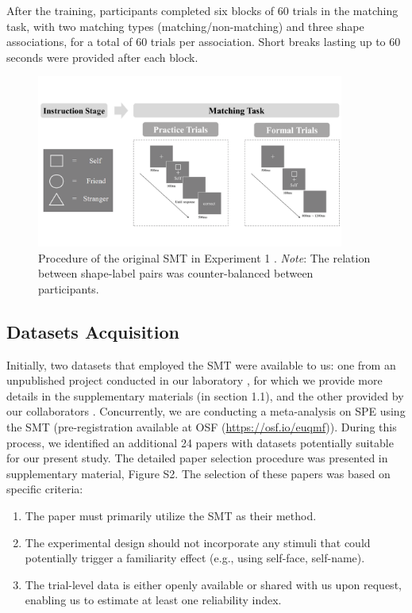 \documentclass[sn-apa]{sn-jnl}%
\theoremstyle{thmstyleone}%
\theoremstyle{thmstyletwo}%
\theoremstyle{thmstylethree}%
\begin{document}
 After the training, participants completed six blocks of 60 trials in the matching task, with two matching types (matching/non-matching) and three shape associations, for a total of 60 trials per association. Short breaks lasting up to 60 seconds were provided after each block. 

\begin{figure}[!htbp]
	\centering
	\includegraphics[width=0.9\textwidth]{./Figure/Fig_1_exp_pro.png}
	\caption{Procedure of the original SMT in Experiment 1 \parencite{sui2012perceptual}. \textit{Note}: The relation between shape-label pairs was counter-balanced between participants.
	}\label{fig:SPMT_procedure}
\end{figure}

\subsection{Datasets Acquisition}\label{subsec:dataset}

Initially, two datasets that employed the SMT were available to us: one from an unpublished project conducted in our laboratory \parencite{hu2023data}, for which we provide more details in the supplementary materials (in section 1.1), and the other provided by our collaborators \parencite{liu2023to}. Concurrently, we are conducting a meta-analysis on SPE using the SMT (pre-registration available at OSF (\url{https://osf.io/euqmf})). During this process, we identified an additional 24 papers with datasets potentially suitable for our present study. The detailed paper selection procedure was presented in supplementary material, Figure S2. The selection of these papers was based on specific criteria:

\begin{enumerate}[label=\arabic*)]
	\item The paper must primarily utilize the SMT as their method.
	\item The experimental design should not incorporate any stimuli that could potentially trigger a familiarity effect (e.g., using self-face, self-name).
	\item The trial-level data is either openly available or shared with us upon request, enabling us to estimate at least one reliability index. 
\end{enumerate}
\end{document}
